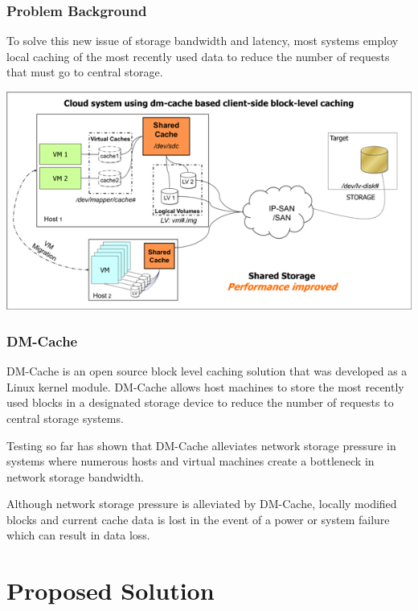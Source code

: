 \documentclass{beamer}
\begin{document}
\begin{frame}
  \frametitle{Problem Background}

  To solve this new issue of storage bandwidth and latency, most
  systems employ local caching of the most recently used data to
  reduce the number of requests that must go to central storage.

  \begin{center}
    \includegraphics[scale=0.85]{../Images/NewerImage.png}
  \end{center}

\end{frame}

\begin{frame}
  \frametitle{DM-Cache}

  DM-Cache is an open source block level caching solution that was
  developed as a Linux kernel module. DM-Cache allows host machines to
  store the most recently used blocks in a designated storage device
  to reduce the number of requests to central storage systems.

  Testing so far has shown that DM-Cache alleviates network storage
  pressure in systems where numerous hosts and virtual machines create
  a bottleneck in network storage bandwidth.

  Although network storage pressure is alleviated by DM-Cache, locally
  modified blocks and current cache data is lost in the event of a
  power or system failure which can result in data loss.

\end{frame}



\section{Proposed Solution}
\end{document}
